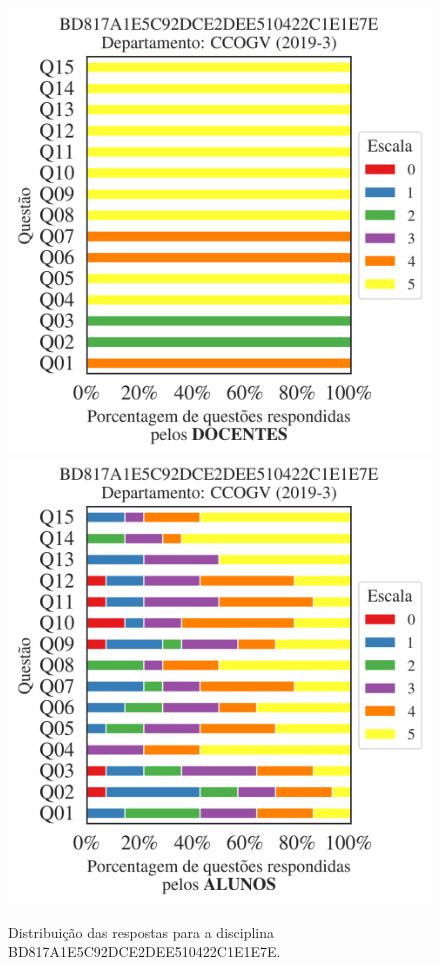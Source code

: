 \documentclass[a4paper,10pt]{article}
\begin{document}
\begin{figure}[h]
\centering
\includegraphics[width=0.485\linewidth]{analise_disciplina_departamento_CCOGV_BD817A1E5C92DCE2DEE510422C1E1E7E_docentes.png}
\includegraphics[width=0.485\linewidth]{analise_disciplina_departamento_CCOGV_BD817A1E5C92DCE2DEE510422C1E1E7E_alunos.png}
\caption{\label{fig:analise_geral_departamento}                Distribuição das respostas para a disciplina BD817A1E5C92DCE2DEE510422C1E1E7E. }
\end{figure}
\end{document}
